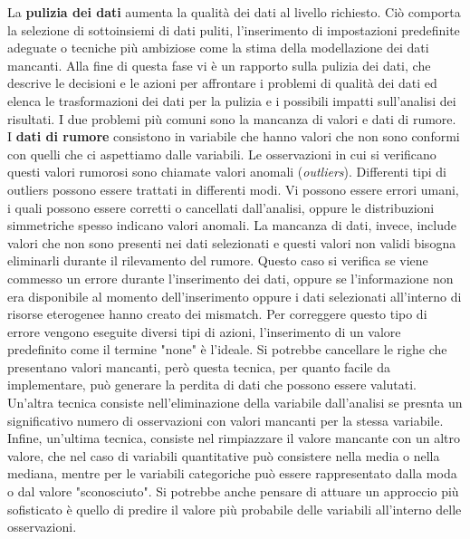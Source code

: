 \documentclass[a4paper]{extarticle}
\begin{document}
La \textbf{pulizia dei dati} aumenta la qualità dei dati al livello richiesto. Ciò comporta la selezione di sottoinsiemi di dati puliti, l'inserimento di impostazioni predefinite adeguate o tecniche più ambiziose come la stima della modellazione dei dati mancanti. Alla fine di questa fase vi è un rapporto sulla pulizia dei dati, che descrive le decisioni e le azioni per affrontare i problemi di qualità dei dati ed elenca le trasformazioni dei dati per la pulizia e i possibili impatti sull'analisi dei risultati. I due problemi più comuni sono la mancanza di valori e dati di rumore. I \textbf{dati di rumore} consistono in variabile che hanno valori che non sono conformi con quelli che ci aspettiamo dalle variabili. Le osservazioni in cui si verificano questi valori rumorosi sono chiamate valori anomali (\textit{outliers}). Differenti tipi di outliers possono essere trattati in differenti modi. Vi possono essere errori umani, i quali possono essere corretti o cancellati dall'analisi, oppure le distribuzioni simmetriche spesso indicano valori anomali. La mancanza di dati, invece, include valori che non sono presenti nei dati selezionati e questi valori non validi bisogna eliminarli durante il rilevamento del rumore. Questo caso si verifica se viene commesso un errore durante l'inserimento dei dati, oppure se l'informazione non era disponibile al momento dell'inserimento oppure i dati selezionati all'interno di risorse eterogenee hanno creato dei mismatch. Per correggere questo tipo di errore vengono eseguite diversi tipi di azioni, l'inserimento di un valore predefinito come il termine "none" è l'ideale. Si potrebbe cancellare le righe che presentano valori mancanti, però questa tecnica, per quanto facile da implementare, può generare la perdita di dati che possono essere valutati. Un'altra tecnica consiste nell'eliminazione della variabile dall'analisi se presnta un significativo numero di osservazioni con valori mancanti per la stessa variabile. Infine, un'ultima tecnica, consiste nel rimpiazzare il valore mancante con un altro valore, che nel caso di variabili quantitative può consistere nella media o nella mediana, mentre per le variabili categoriche può essere rappresentato dalla moda o dal valore "sconosciuto". Si potrebbe anche pensare di attuare un approccio più sofisticato è quello di predire il valore più probabile delle variabili all'interno delle osservazioni.
\end{document}
